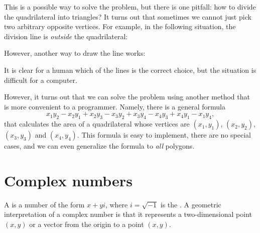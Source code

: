 This is a possible way to solve the problem,
but there is one pitfall:
how to divide the quadrilateral into triangles?
It turns out that sometimes we cannot just pick
two arbitrary opposite vertices.
For example, in the following situation,
the division line is \emph{outside} the quadrilateral:
\begin{center}
\end{center}
However, another way to draw the line works:
\begin{center}
\end{center}
It is clear for a human which of the lines is the correct
choice, but the situation is difficult for a computer.

However, it turns out that we can solve the problem using
another method that is more convenient to a programmer.
Namely, there is a general formula
\[x_1y_2-x_2y_1+x_2y_3-x_3y_2+x_3y_4-x_4y_3+x_4y_1-x_1y_4,\]
that calculates the area of a quadrilateral
whose vertices are
$(x_1,y_1)$,
$(x_2,y_2)$,
$(x_3,y_3)$ and
$(x_4,y_4)$.
This formula is easy to implement, there are no special
cases, and we can even generalize the formula
to \emph{all} polygons.

\section{Complex numbers}


A  is a number of the form $x+y i$,
where $i = \sqrt{-1}$ is the .
A geometric interpretation of a complex number is
that it represents a two-dimensional point $(x,y)$
or a vector from the origin to a point $(x,y)$.

